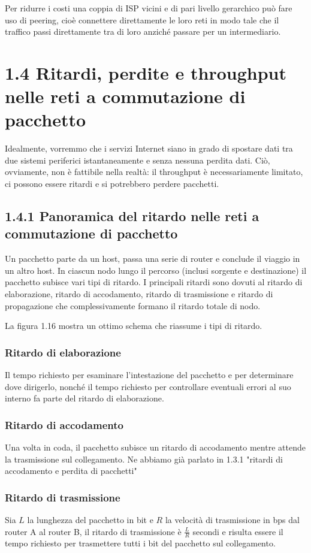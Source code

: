 \documentclass{book}
\begin{document}
Per ridurre i costi una coppia di ISP vicini e di pari livello gerarchico può fare uso di peering, cioè connettere direttamente le loro reti in modo tale che il traffico passi direttamente tra di loro anziché passare per un intermediario.
	
\section*{1.4 Ritardi, perdite e throughput nelle reti a commutazione di pacchetto}
Idealmente, vorremmo che i servizi Internet siano in grado di spostare dati tra due sistemi periferici istantaneamente e senza nessuna perdita dati. Ciò, ovviamente, non è fattibile nella realtà: il throughput è necessariamente limitato, ci possono essere ritardi e si potrebbero perdere pacchetti.
	
\subsection*{1.4.1 Panoramica del ritardo nelle reti a commutazione di pacchetto}
Un pacchetto parte da un host, passa una serie di router e conclude il viaggio in un altro host. In ciascun nodo lungo il percorso (inclusi sorgente e destinazione) il pacchetto subisce vari tipi di ritardo. I principali ritardi sono dovuti al ritardo di elaborazione, ritardo di accodamento, ritardo di trasmissione e ritardo di propagazione che complessivamente formano il ritardo totale di nodo. 
	
La figura 1.16 mostra un ottimo schema che riassume i tipi di ritardo.
	
\subsubsection{Ritardo di elaborazione}
Il tempo richiesto per esaminare l'intestazione del pacchetto e per determinare dove dirigerlo, nonché il tempo richiesto per controllare eventuali errori al suo interno fa parte del ritardo di elaborazione.
	
\subsubsection{Ritardo di accodamento}
Una volta in coda, il pacchetto subisce un ritardo di accodamento mentre attende la trasmissione sul collegamento. Ne abbiamo già parlato in 1.3.1 "ritardi di accodamento e perdita di pacchetti"
	
\subsubsection{Ritardo di trasmissione}
Sia $L$ la lunghezza del pacchetto in bit e $R$ la velocità di trasmissione in bps dal router A al router B, il ritardo di trasmissione è $\frac{L}{R}$ secondi e risulta essere il tempo richiesto per trasmettere tutti i bit del pacchetto sul collegamento.
\end{document}
